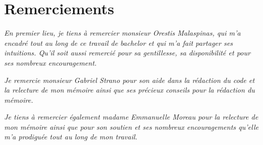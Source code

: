 \chapter*{Remerciements} %

\textit{En premier lieu, je tiens à remercier monsieur Orestis Malaspinas, qui
m'a encadré tout au long de ce travail de bachelor et qui m'a fait partager ses
intuitions. Qu'il soit aussi remercié pour sa gentillesse, sa disponibilité et
pour ses nombreux encouragement.}

\textit{Je remercie monsieur Gabriel Strano pour son aide dans la rédaction du
	code et	la relecture de mon mémoire ainsi que ses précieux conseils pour la
rédaction du mémoire.}

\textit{Je tiens à remercier également madame Emmanuelle Moreau pour la 
	relecture de mon mémoire ainsi que pour son soutien et ses nombreux 
	encouragements qu'elle m'a prodiguée tout au long de mon travail.}


